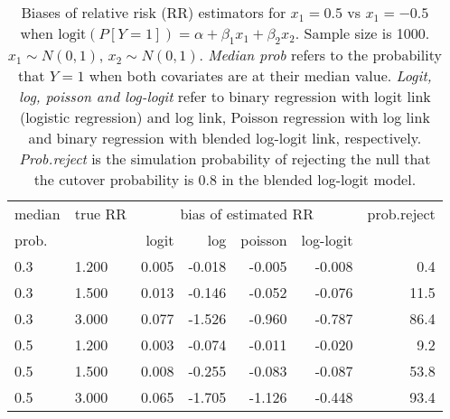 \documentclass[12pt,a4paper]{article}
\begin{document}
\begin{table}[H] 
\small\sf\centering 
\caption{Biases of relative risk (RR) estimators for $x_1=0.5$ vs $x_1=-0.5$ when $\mbox{logit}(P[Y=1])=\alpha+\beta_1 x_1 + \beta_2 x_2$. Sample size is 1000. $x_1 \sim $$N(0,1)$, $x_2 \sim N(0,1)$. {\it Median prob} refers to the probability that $Y=1$ when both covariates are at their median value. {\it Logit, log, poisson and log-logit} refer to binary regression with logit link (logistic regression) and log link, Poisson regression with log link and binary regression with blended log-logit link, respectively. {\it Prob.reject} is the simulation probability of rejecting the null that the cutover probability is $0.8$ in the blended log-logit model.} 
\begin{tabular}{llrrrrr} 
\toprule 
median & true RR & \multicolumn{4}{c}{bias of estimated RR} & prob.reject \\ 
prob. & & logit & log & poisson & log-logit  & \\ \midrule 
0.3 & 1.200 & 0.005 & -0.018 & -0.005 & -0.008 &  0.4 \\  
0.3 & 1.500 & 0.013 & -0.146 & -0.052 & -0.076 & 11.5 \\  
0.3 & 3.000 & 0.077 & -1.526 & -0.960 & -0.787 & 86.4 \\  
0.5 & 1.200 & 0.003 & -0.074 & -0.011 & -0.020 &  9.2 \\  
0.5 & 1.500 & 0.008 & -0.255 & -0.083 & -0.087 & 53.8 \\  
0.5 & 3.000 & 0.065 & -1.705 & -1.126 & -0.448 & 93.4 \\  
\bottomrule 
\end{tabular} 
\end{table} 
\end{document}
